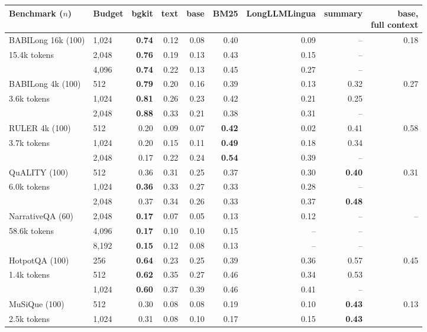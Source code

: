 \begin{tabular}{llrrrrrr|r}
\toprule
Benchmark ($n$) & Budget & bgkit & text & base & BM25 & LongLLMLingua & summary & \shortstack{base,\\full context} \\
\midrule
BABILong 16k (100) & 1,024 & \textbf{0.74} & 0.12 & 0.08 & 0.40 & 0.09 & -- & 0.18 \\
\quad 15.4k tokens & 2,048 & \textbf{0.76} & 0.19 & 0.13 & 0.43 & 0.15 & -- &  \\
 & 4,096 & \textbf{0.74} & 0.22 & 0.13 & 0.45 & 0.27 & -- &  \\
\midrule
BABILong 4k (100) & 512 & \textbf{0.79} & 0.20 & 0.16 & 0.39 & 0.13 & 0.32 & 0.27 \\
\quad 3.6k tokens & 1,024 & \textbf{0.81} & 0.26 & 0.23 & 0.42 & 0.21 & 0.25 &  \\
 & 2,048 & \textbf{0.88} & 0.33 & 0.21 & 0.38 & 0.31 & -- &  \\
\midrule
RULER 4k (100) & 512 & 0.20 & 0.09 & 0.07 & \textbf{0.42} & 0.02 & 0.41 & 0.58 \\
\quad 3.7k tokens & 1,024 & 0.20 & 0.15 & 0.11 & \textbf{0.49} & 0.18 & 0.34 &  \\
 & 2,048 & 0.17 & 0.22 & 0.24 & \textbf{0.54} & 0.39 & -- &  \\
\midrule
QuALITY (100) & 512 & 0.36 & 0.31 & 0.25 & 0.37 & 0.30 & \textbf{0.40} & 0.31 \\
\quad 6.0k tokens & 1,024 & \textbf{0.36} & 0.33 & 0.27 & 0.33 & 0.28 & -- &  \\
 & 2,048 & 0.37 & 0.34 & 0.26 & 0.33 & 0.37 & \textbf{0.48} &  \\
\midrule
NarrativeQA (60) & 2,048 & \textbf{0.17} & 0.07 & 0.05 & 0.13 & 0.12 & -- & -- \\
\quad 58.6k tokens & 4,096 & \textbf{0.17} & 0.10 & 0.10 & 0.15 & -- & -- &  \\
 & 8,192 & \textbf{0.15} & 0.12 & 0.08 & 0.13 & -- & -- &  \\
\midrule
HotpotQA (100) & 256 & \textbf{0.64} & 0.23 & 0.25 & 0.39 & 0.36 & 0.57 & 0.45 \\
\quad 1.4k tokens & 512 & \textbf{0.62} & 0.35 & 0.27 & 0.46 & 0.34 & 0.53 &  \\
 & 1,024 & \textbf{0.60} & 0.37 & 0.39 & 0.46 & 0.41 & -- &  \\
\midrule
MuSiQue (100) & 512 & 0.30 & 0.08 & 0.08 & 0.19 & 0.10 & \textbf{0.43} & 0.13 \\
\quad 2.5k tokens & 1,024 & 0.31 & 0.08 & 0.10 & 0.17 & 0.15 & \textbf{0.43} &  \\

\end{tabular}
